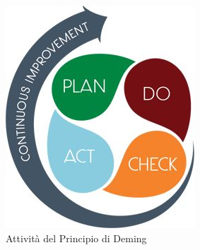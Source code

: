 \documentclass[a4paper, titlepage]{article}
\begin{document}
\begin{figure}[htp]
\centering
\includegraphics[scale=0.60]{Img/PDCA.jpg}
\caption{Attività del Principio di Deming}
\label{}
\end{figure}

\newpage
\end{document}
